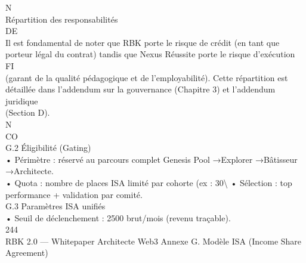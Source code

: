 \documentclass[12pt,landscape,a4paper]{article}
\begin{document}
\vspace{0.5em}
\vspace{0.5em}
\vspace{0.5em}
N\\
Répartition des responsabilités\\
\vspace{0.5em}
\vspace{0.5em}
\vspace{0.5em}
\vspace{0.5em}
DE\\
Il est fondamental de noter que RBK porte le risque de crédit (en tant que porteur légal du contrat) tandis que Nexus Réussite porte le risque d’exécution\\
\vspace{0.5em}
\vspace{0.5em}
\vspace{0.5em}
\vspace{0.5em}
FI\\
(garant de la qualité pédagogique et de l’employabilité). Cette répartition est détaillée dans l’addendum sur la gouvernance (Chapitre 3) et l’addendum juridique\\
(Section D).\\
\vspace{0.5em}
\vspace{0.5em}
N\\
CO\\
G.2 Éligibilité (Gating)\\
• Périmètre : réservé au parcours complet Genesis Pool →Explorer →Bâtisseur →Architecte.\\
\vspace{0.5em}
• Quota : nombre de places ISA limité par cohorte (ex : 30\textbackslash{}%
\vspace{0.5em}
• Sélection : top performance + validation par comité.\\
\vspace{0.5em}
\vspace{0.5em}
\vspace{0.5em}
G.3 Paramètres ISA unifiés\\
• Seuil de déclenchement : 2500 brut/mois (revenu traçable).\\
\vspace{0.5em}
\vspace{0.5em}
\vspace{0.5em}
244\\
RBK 2.0 — Whitepaper Architecte Web3                                                                         Annexe G. Modèle ISA (Income Share Agreement)\\
\end{document}
